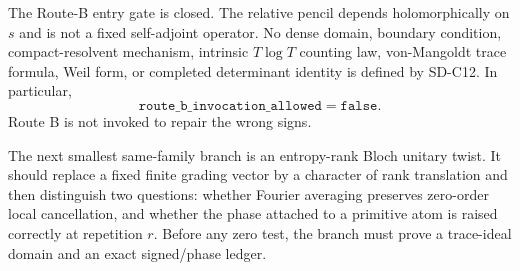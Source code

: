 \begin{center}\end{center}

The Route-B entry gate is closed.  The relative pencil depends holomorphically
on $s$ and is not a fixed self-adjoint operator.  No dense domain, boundary
condition, compact-resolvent mechanism, intrinsic $T\log T$ counting law,
von-Mangoldt trace formula, Weil form, or completed determinant identity is
defined by SD-C12.  In particular,
\[
 \mathtt{route\_b\_invocation\_allowed=false}.                   \tag{8.2}
\]
Route B is not invoked to repair the wrong signs.

The next smallest same-family branch is an entropy-rank Bloch unitary twist.
It should replace a fixed finite grading vector by a character of rank
translation and then distinguish two questions: whether Fourier averaging
preserves zero-order local cancellation, and whether the phase attached to a
primitive atom is raised correctly at repetition $r$.  Before any zero test,
the branch must prove a trace-ideal domain and an exact signed/phase ledger.
